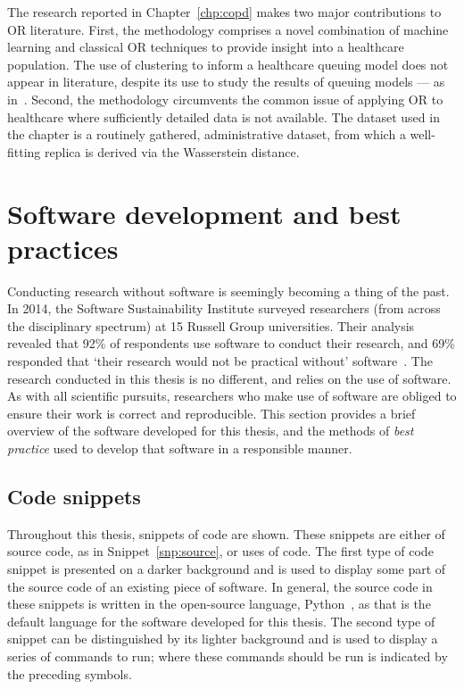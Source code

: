 The research reported in Chapter~\ref{chp:copd} makes two major contributions to
OR literature. First, the methodology comprises a novel combination of machine
learning and classical OR techniques to provide insight into a healthcare
population. The use of clustering to inform a healthcare queuing model does not
appear in literature, despite its use to study the results of queuing models ---
as in~\cite{Prokofyeva2020,Rebuge2012}. Second, the methodology circumvents the
common issue of applying OR to healthcare where sufficiently detailed data is
not available. The dataset used in the chapter is a routinely gathered,
administrative dataset, from which a well-fitting replica is derived via the
Wasserstein distance.


\section{Software development and best practices}\label{sec:dev}

Conducting research without software is seemingly becoming a thing of the past.
In 2014, the Software Sustainability Institute surveyed researchers (from across
the disciplinary spectrum) at 15 Russell Group universities. Their analysis
revealed that 92\% of respondents use software to conduct their research, and
69\% responded that `their research would not be practical without'
software~\cite{Hettrick2014}. The research conducted in this thesis is no
different, and relies on the use of software. As with all scientific pursuits,
researchers who make use of software are obliged to ensure their work is correct
and reproducible. This section provides a brief overview of the software
developed for this thesis, and the methods of \emph{best practice} used to
develop that software in a responsible manner.

\subsection{Code snippets}

Throughout this thesis, snippets of code are shown. These snippets are either of
source code, as in Snippet~\ref{snp:source}, or uses of code. The first type of
code snippet is presented on a darker background and is used to display some
part of the source code of an existing piece of software. In general, the source
code in these snippets is written in the open-source language,
Python~\cite{python}, as that is the default language for the software developed
for this thesis. The second type of snippet can be distinguished by its lighter
background and is used to display a series of commands to run; where these
commands should be run is indicated by the preceding symbols.

